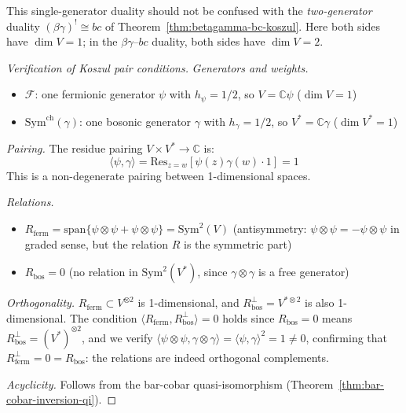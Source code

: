 \begin{remark}
This single-generator duality should not be confused with the \emph{two-generator} duality $(\beta\gamma)^! \cong bc$ of Theorem~\ref{thm:betagamma-bc-koszul}.  Here both sides have $\dim V = 1$; in the $\beta\gamma$--$bc$ duality, both sides have $\dim V = 2$.
\end{remark}

\begin{proof}[Verification of Koszul pair conditions]
\noindent\emph{Generators and weights.}
\begin{itemize}
\item $\mathcal{F}$: one fermionic generator $\psi$ with $h_\psi = 1/2$, so $V = \mathbb{C}\psi$ ($\dim V = 1$)
\item $\mathrm{Sym}^{\mathrm{ch}}(\gamma)$: one bosonic generator $\gamma$ with $h_\gamma = 1/2$, so $V^* = \mathbb{C}\gamma$ ($\dim V^* = 1$)
\end{itemize}

\noindent\emph{Pairing.} The residue pairing $V \times V^* \to \mathbb{C}$ is:
\[\langle\psi, \gamma\rangle = \mathrm{Res}_{z=w}\left[\psi(z)\gamma(w) \cdot 1\right] = 1\]
This is a non-degenerate pairing between 1-dimensional spaces.

\noindent\emph{Relations.}
\begin{itemize}
\item $R_{\mathrm{ferm}} = \mathrm{span}\{\psi \otimes \psi + \psi \otimes \psi\} = \mathrm{Sym}^2(V)$ (antisymmetry: $\psi \otimes \psi = -\psi \otimes \psi$ in graded sense, but the relation $R$ is the symmetric part)
\item $R_{\mathrm{bos}} = 0$ (no relation in $\mathrm{Sym}^2(V^*)$, since $\gamma \otimes \gamma$ is a free generator)
\end{itemize}

\noindent\emph{Orthogonality.} $R_{\mathrm{ferm}} \subset V^{\otimes 2}$ is 1-dimensional, and $R_{\mathrm{bos}}^\perp = V^{*\otimes 2}$ is also 1-dimensional.  The condition $\langle R_{\mathrm{ferm}}, R_{\mathrm{bos}}^\perp \rangle = 0$ holds since $R_{\mathrm{bos}} = 0$ means $R_{\mathrm{bos}}^\perp = (V^*)^{\otimes 2}$, and we verify $\langle \psi \otimes \psi, \gamma \otimes \gamma \rangle = \langle \psi, \gamma \rangle^2 = 1 \neq 0$, confirming that $R_{\mathrm{ferm}}^\perp = 0 = R_{\mathrm{bos}}$: the relations are indeed orthogonal complements.

\noindent\emph{Acyclicity.} Follows from the bar-cobar quasi-isomorphism (Theorem~\ref{thm:bar-cobar-inversion-qi}).
\end{proof}
 


